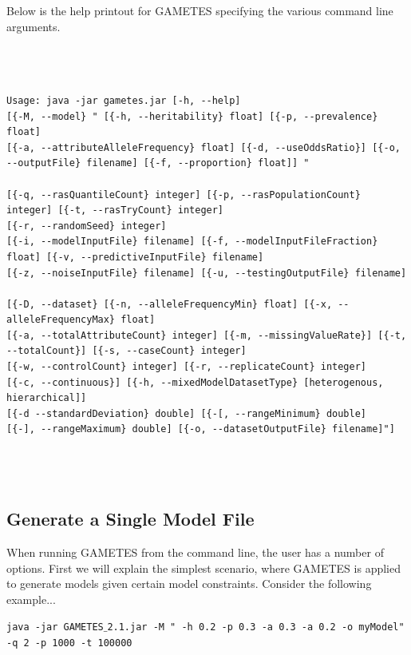 \documentclass{report}
\begin{document}
Below is the help printout for GAMETES specifying the various command line arguments.\\ \\
\begin{scriptsize}
\begin{verbatim}


Usage: java -jar gametes.jar [-h, --help]
[{-M, --model} " [{-h, --heritability} float] [{-p, --prevalence} float]
[{-a, --attributeAlleleFrequency} float] [{-d, --useOddsRatio}] [{-o, --outputFile} filename] [{-f, --proportion} float]] "

[{-q, --rasQuantileCount} integer] [{-p, --rasPopulationCount} integer] [{-t, --rasTryCount} integer]
[{-r, --randomSeed} integer]
[{-i, --modelInputFile} filename] [{-f, --modelInputFileFraction} float] [{-v, --predictiveInputFile} filename] 
[{-z, --noiseInputFile} filename] [{-u, --testingOutputFile} filename]

[{-D, --dataset} [{-n, --alleleFrequencyMin} float] [{-x, --alleleFrequencyMax} float]
[{-a, --totalAttributeCount} integer] [{-m, --missingValueRate}] [{-t, --totalCount}] [{-s, --caseCount} integer]
[{-w, --controlCount} integer] [{-r, --replicateCount} integer]
[{-c, --continuous}] [{-h, --mixedModelDatasetType} [heterogenous, hierarchical]] 
[{-d --standardDeviation} double] [{-[, --rangeMinimum} double] 
[{-], --rangeMaximum} double] [{-o, --datasetOutputFile} filename]"]




\end{verbatim}
\end{scriptsize}

\subsection{Generate a Single Model File}
When running GAMETES from the command line, the user has a number of options.  First we will explain the simplest scenario, where GAMETES is applied to generate models given certain model constraints.  Consider the following example...

\begin{center}
\texttt{java -jar GAMETES$\_$2.1.jar -M " -h 0.2 -p 0.3 -a 0.3 -a 0.2 -o myModel" -q 2 -p 1000 -t 100000}
\end{center}
\end{document}
